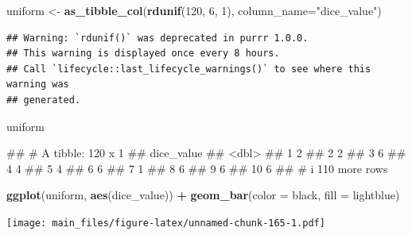 \documentclass[
]{book}
\newenvironment{Shaded}{\begin{snugshade}}{\end{snugshade}}
\newcommand{\AttributeTok}[1]{\textcolor[rgb]{0.13,0.29,0.53}{#1}}
\newcommand{\DecValTok}[1]{\textcolor[rgb]{0.00,0.00,0.81}{#1}}
\newcommand{\FunctionTok}[1]{\textcolor[rgb]{0.13,0.29,0.53}{\textbf{#1}}}
\newcommand{\NormalTok}[1]{#1}
\newcommand{\OtherTok}[1]{\textcolor[rgb]{0.56,0.35,0.01}{#1}}
\newcommand{\SpecialCharTok}[1]{\textcolor[rgb]{0.81,0.36,0.00}{\textbf{#1}}}
\newcommand{\StringTok}[1]{\textcolor[rgb]{0.31,0.60,0.02}{#1}}
\begin{document}
\begin{Shaded}
\begin{Highlighting}[]
\NormalTok{uniform }\OtherTok{\textless{}{-}} \FunctionTok{as\_tibble\_col}\NormalTok{(}\FunctionTok{rdunif}\NormalTok{(}\DecValTok{120}\NormalTok{, }\DecValTok{6}\NormalTok{, }\DecValTok{1}\NormalTok{), }\AttributeTok{column\_name=}\StringTok{"dice\_value"}\NormalTok{)}
\end{Highlighting}
\end{Shaded}

\begin{verbatim}
## Warning: `rdunif()` was deprecated in purrr 1.0.0.
## This warning is displayed once every 8 hours.
## Call `lifecycle::last_lifecycle_warnings()` to see where this warning was
## generated.
\end{verbatim}

\begin{Shaded}
\begin{Highlighting}[]
\NormalTok{uniform}
\end{Highlighting}
\end{Shaded}

\begin{Shaded}
\begin{Highlighting}[]
\NormalTok{\#\# \# A tibble: 120 x 1}
\NormalTok{\#\#    dice\_value}
\NormalTok{\#\#         \textless{}dbl\textgreater{}}
\NormalTok{\#\#  1          2}
\NormalTok{\#\#  2          2}
\NormalTok{\#\#  3          6}
\NormalTok{\#\#  4          4}
\NormalTok{\#\#  5          4}
\NormalTok{\#\#  6          6}
\NormalTok{\#\#  7          1}
\NormalTok{\#\#  8          6}
\NormalTok{\#\#  9          6}
\NormalTok{\#\# 10          6}
\NormalTok{\#\# \# i 110 more rows}
\end{Highlighting}
\end{Shaded}

\begin{Shaded}
\begin{Highlighting}[]
\FunctionTok{ggplot}\NormalTok{(uniform, }\FunctionTok{aes}\NormalTok{(dice\_value)) }\SpecialCharTok{+}
  \FunctionTok{geom\_bar}\NormalTok{(}\AttributeTok{color =} \StringTok{\textquotesingle{}black\textquotesingle{}}\NormalTok{,}
           \AttributeTok{fill =} \StringTok{\textquotesingle{}lightblue\textquotesingle{}}\NormalTok{)}
\end{Highlighting}
\end{Shaded}

\texttt{[image: main\_files/figure-latex/unnamed-chunk-165-1.pdf]}
\end{document}
